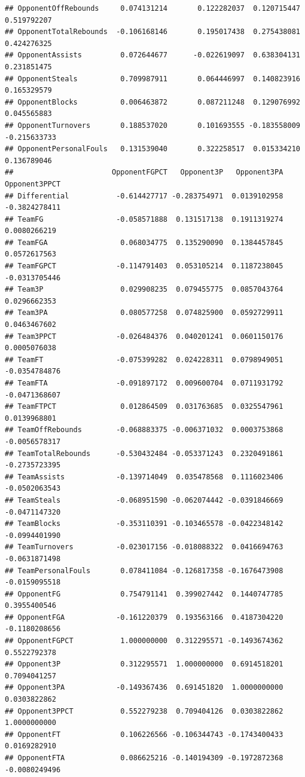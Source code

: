 \documentclass[]{book}
\begin{document}
\begin{verbatim}
## OpponentOffRebounds     0.074131214       0.122282037  0.120715447  0.519792207
## OpponentTotalRebounds  -0.106168146       0.195017438  0.275438081  0.424276325
## OpponentAssists         0.072644677      -0.022619097  0.638304131  0.231851475
## OpponentSteals          0.709987911       0.064446997  0.140823916  0.165329579
## OpponentBlocks          0.006463872       0.087211248  0.129076992  0.045565883
## OpponentTurnovers       0.188537020       0.101693555 -0.183558009 -0.215633733
## OpponentPersonalFouls   0.131539040       0.322258517  0.015334210  0.136789046
##                       OpponentFGPCT   Opponent3P   Opponent3PA Opponent3PPCT
## Differential           -0.614427717 -0.283754971  0.0139102958 -0.3824278411
## TeamFG                 -0.058571888  0.131517138  0.1911319274  0.0080266219
## TeamFGA                 0.068034775  0.135290090  0.1384457845  0.0572617563
## TeamFGPCT              -0.114791403  0.053105214  0.1187238045 -0.0313705446
## Team3P                  0.029908235  0.079455775  0.0857043764  0.0296662353
## Team3PA                 0.080577258  0.074825900  0.0592729911  0.0463467602
## Team3PPCT              -0.026484376  0.040201241  0.0601150176  0.0005076038
## TeamFT                 -0.075399282  0.024228311  0.0798949051 -0.0354784876
## TeamFTA                -0.091897172  0.009600704  0.0711931792 -0.0471368607
## TeamFTPCT               0.012864509  0.031763685  0.0325547961  0.0139968801
## TeamOffRebounds        -0.068883375 -0.006371032  0.0003753868 -0.0056578317
## TeamTotalRebounds      -0.530432484 -0.053371243  0.2320491861 -0.2735723395
## TeamAssists            -0.139714049  0.035478568  0.1116023406 -0.0502063543
## TeamSteals             -0.068951590 -0.062074442 -0.0391846669 -0.0471147320
## TeamBlocks             -0.353110391 -0.103465578 -0.0422348142 -0.0994401990
## TeamTurnovers          -0.023017156 -0.018088322  0.0416694763 -0.0631871498
## TeamPersonalFouls       0.078411084 -0.126817358 -0.1676473908 -0.0159095518
## OpponentFG              0.754791141  0.399027442  0.1440747785  0.3955400546
## OpponentFGA            -0.161220379  0.193563166  0.4187304220 -0.1180208656
## OpponentFGPCT           1.000000000  0.312295571 -0.1493674362  0.5522792378
## Opponent3P              0.312295571  1.000000000  0.6914518201  0.7094041257
## Opponent3PA            -0.149367436  0.691451820  1.0000000000  0.0303822862
## Opponent3PPCT           0.552279238  0.709404126  0.0303822862  1.0000000000
## OpponentFT              0.106226566 -0.106344743 -0.1743400433  0.0169282910
## OpponentFTA             0.086625216 -0.140194309 -0.1972872368 -0.0080249496

\end{verbatim}
\end{document}

